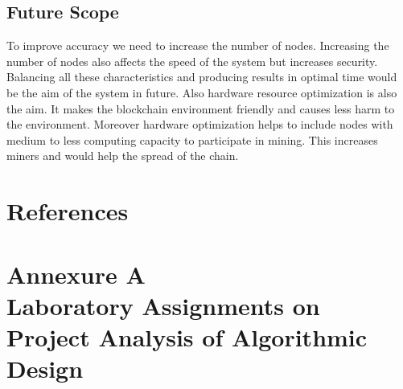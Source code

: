 \documentclass[oneside, 12pt]{book}
\begin{document}
		\subsection{Future Scope}
			To improve accuracy we need to increase the number of nodes. Increasing the number of nodes also affects the speed of the system but increases security. Balancing all these characteristics and producing results in optimal time would be the aim of the system in future. Also hardware resource optimization is also the aim. It makes the blockchain environment friendly and causes less harm to the environment. Moreover hardware optimization helps to include nodes with medium to less computing capacity to participate in mining. This increases miners and  would help the spread of the chain.
	\newpage
	\section{References}
	\newpage
		
		
	\newpage
	\section{Annexure A\\Laboratory Assignments on Project Analysis of Algorithmic Design}
	\newpage
\end{document}

